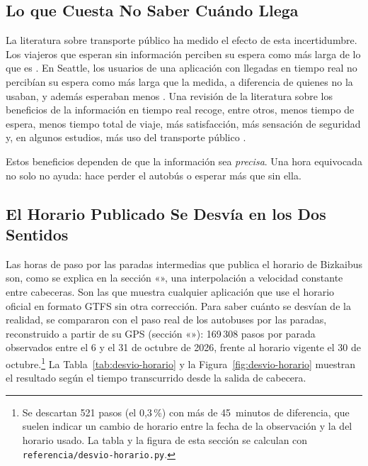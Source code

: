 \subsection{Lo que Cuesta No Saber Cuándo Llega}
\label{sec:coste-incertidumbre}

La literatura sobre transporte público ha medido el efecto de esta incertidumbre. Los viajeros que esperan sin
información perciben su espera como más larga de lo que es \citep{mishalani2006}. En Seattle, los usuarios de una
aplicación con llegadas en tiempo real no percibían su espera como más larga que la medida, a diferencia de quienes no
la usaban, y además esperaban menos \citep{watkins2011}. Una revisión de la literatura sobre los beneficios de la
información en tiempo real recoge, entre otros, menos tiempo de espera, menos tiempo total de viaje, más satisfacción,
más sensación de seguridad y, en algunos estudios, más uso del transporte público \citep{brakewood2019}.

Estos beneficios dependen de que la información sea \emph{precisa}. Una hora equivocada no solo no ayuda: hace perder
el autobús o esperar más que sin ella.

\subsection{El Horario Publicado Se Desvía en los Dos Sentidos}
\label{sec:desvio-horario}

Las horas de paso por las paradas intermedias que publica el horario de Bizkaibus son, como se explica en la
sección «», una interpolación a velocidad constante entre cabeceras. Son las que muestra cualquier
aplicación que use el horario oficial en formato GTFS sin otra corrección. Para saber cuánto se desvían de la realidad,
se compararon con el paso real de los autobuses por las paradas, reconstruido a partir de su GPS
(sección «»): 169\,308 pasos por parada observados entre el 6 y el 31 de octubre de 2026,
frente al horario vigente el 30 de octubre.\footnote{Se descartan 521 pasos (el 0,3\,\%) con más de 45~minutos de
diferencia, que suelen indicar un cambio de horario entre la fecha de la observación y la del horario usado. La tabla y la figura de esta
sección se calculan con \texttt{referencia/desvio-horario.py}.} La Tabla~\ref{tab:desvio-horario} y la Figura~\ref{fig:desvio-horario}
muestran el resultado según el tiempo transcurrido desde la salida de cabecera.

